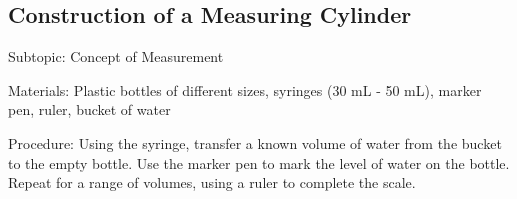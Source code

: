 \subsection{Construction of a Measuring Cylinder}
\label{sub:meascyl}
\begin{description*}
\item[Subtopic:]{Concept of Measurement}
\item[Materials:]{Plastic bottles of different sizes, syringes (30 mL - 50 mL), marker pen, ruler, bucket of water}
\item[Procedure:]{Using the syringe, transfer a known volume of water from the bucket to the empty bottle. Use the marker pen to mark the level of water on the bottle. Repeat for a range of volumes, using a ruler to complete the scale.}
\end{description*}

